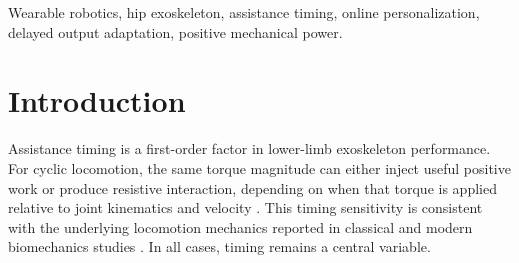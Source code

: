 \documentclass[lettersize,journal]{IEEEtran}
\DeclareRobustCommand{\hao}[1]{{\textcolor{red}{#1}}} %
\begin{document}

\begin{IEEEkeywords}
Wearable robotics, hip exoskeleton, assistance timing, online personalization, delayed output adaptation, positive mechanical power.
\end{IEEEkeywords}

\section{Introduction}

Assistance timing is a first-order factor in lower-limb exoskeleton performance. For cyclic locomotion, the same torque magnitude can either inject useful positive work or produce resistive interaction, depending on when that torque is applied relative to joint kinematics and velocity \cite{sawicki2015timing,lee2017timing,grimmer2019comparison}. This timing sensitivity is consistent with the underlying locomotion mechanics reported in classical and modern biomechanics studies \cite{cavagna1977work,winter1987biomechanics,farris2012mechanics,donelan2002step,nuckols2020mechanics}. In all cases, timing remains a central variable.
\end{document}

